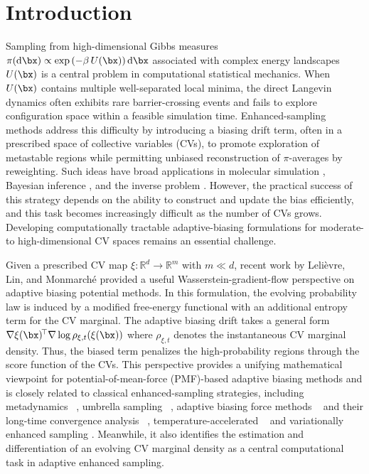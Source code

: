 \documentclass[a4paper,fleqn]{cas-sc}
\theoremstyle{definition}
\begin{document}
\section{Introduction}






Sampling from high-dimensional Gibbs measures \(
\pi({\rm d} \bx) \propto \exp\left(-\beta\,U(\bx)\right) {\rm d} \bx \) associated with complex energy landscapes $U(\bx)$ is a central problem in computational statistical mechanics. When $U(\bx)$ contains multiple well-separated local minima, the direct Langevin dynamics often exhibits rare barrier-crossing events and fails to explore configuration space within a feasible simulation time. Enhanced-sampling methods address this difficulty by introducing a biasing drift term, often in a prescribed space of collective variables (CVs), to promote exploration of metastable regions while permitting unbiased reconstruction of $\pi$-averages by reweighting. Such ideas have broad applications in molecular simulation \cite{shaw2010atomic}, Bayesian inference \cite{welling2011bayesian}, and the inverse problem \cite{stuart2010inverse}. However, the practical success of this strategy depends on the ability to construct and update the bias efficiently, and this task becomes increasingly difficult as the number of CVs grows. Developing computationally tractable adaptive-biasing formulations for moderate- to high-dimensional CV spaces remains an essential challenge.





Given a prescribed CV map \(\xi:\mathbb{R}^{d}\to\mathbb{R}^m\) with $m\ll d$, recent work \cite{lelievre2025convergence} by Leli\`evre, Lin, and Monmarch\'e provided a useful Wasserstein-gradient-flow perspective on adaptive biasing potential methods. 
In this formulation, the evolving probability law is induced by a modified free-energy functional with an additional entropy term for the CV marginal. The adaptive biasing drift takes a general form 
$\nabla\xi(\bx)^{\!\top}\nabla\log\rho_{\xi,t}(\xi(\bx))$ where \(\rho_{\xi,t}\)  denotes the instantaneous CV marginal density. Thus, the biased term 
penalizes the high-probability regions through the score function of the CVs. 
This perspective provides a unifying mathematical viewpoint for potential-of-mean-force (PMF)-based adaptive biasing methods and is closely related to classical enhanced-sampling strategies, including metadynamics ~\cite{laio2002escaping,barducci2008well}, umbrella sampling ~\cite{torrie1977nonphysical}, adaptive biasing force methods ~\cite{Darve_Pohorille_JCP_2001,darve2008adaptive} and their long-time convergence analysis ~\cite{lelievre2008long,chipot2011enhanced}, temperature-accelerated ~\cite{maragliano2006temperature,rosso2002use} and variationally enhanced sampling \cite{valsson2014variational,bonati2019neural}. Meanwhile, it also identifies the estimation and differentiation of an evolving CV marginal density as a central computational task in adaptive enhanced sampling.
\end{document}
